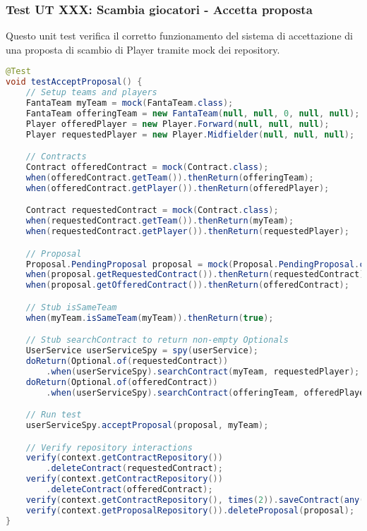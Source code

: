 \subsubsection{Test UT XXX: Scambia giocatori - Accetta proposta}

Questo unit test verifica il corretto funzionamento del sistema di accettazione di una proposta di scambio di Player 
tramite mock dei repository.

\begin{lstlisting}[language=Java]
@Test
void testAcceptProposal() {
	// Setup teams and players
	FantaTeam myTeam = mock(FantaTeam.class);
	FantaTeam offeringTeam = new FantaTeam(null, null, 0, null, null);
	Player offeredPlayer = new Player.Forward(null, null, null);
	Player requestedPlayer = new Player.Midfielder(null, null, null);

	// Contracts
	Contract offeredContract = mock(Contract.class);
	when(offeredContract.getTeam()).thenReturn(offeringTeam);
	when(offeredContract.getPlayer()).thenReturn(offeredPlayer);

    Contract requestedContract = mock(Contract.class);
    when(requestedContract.getTeam()).thenReturn(myTeam);
	when(requestedContract.getPlayer()).thenReturn(requestedPlayer);

	// Proposal
	Proposal.PendingProposal proposal = mock(Proposal.PendingProposal.class);
	when(proposal.getRequestedContract()).thenReturn(requestedContract);
	when(proposal.getOfferedContract()).thenReturn(offeredContract);

	// Stub isSameTeam
	when(myTeam.isSameTeam(myTeam)).thenReturn(true);

	// Stub searchContract to return non-empty Optionals
	UserService userServiceSpy = spy(userService);
	doReturn(Optional.of(requestedContract))
        .when(userServiceSpy).searchContract(myTeam, requestedPlayer);
	doReturn(Optional.of(offeredContract))
        .when(userServiceSpy).searchContract(offeringTeam, offeredPlayer);

	// Run test
	userServiceSpy.acceptProposal(proposal, myTeam);

	// Verify repository interactions
	verify(context.getContractRepository())
        .deleteContract(requestedContract);
	verify(context.getContractRepository())
        .deleteContract(offeredContract);
	verify(context.getContractRepository(), times(2)).saveContract(any(Contract.class));
	verify(context.getProposalRepository()).deleteProposal(proposal);
}
\end{lstlisting}


